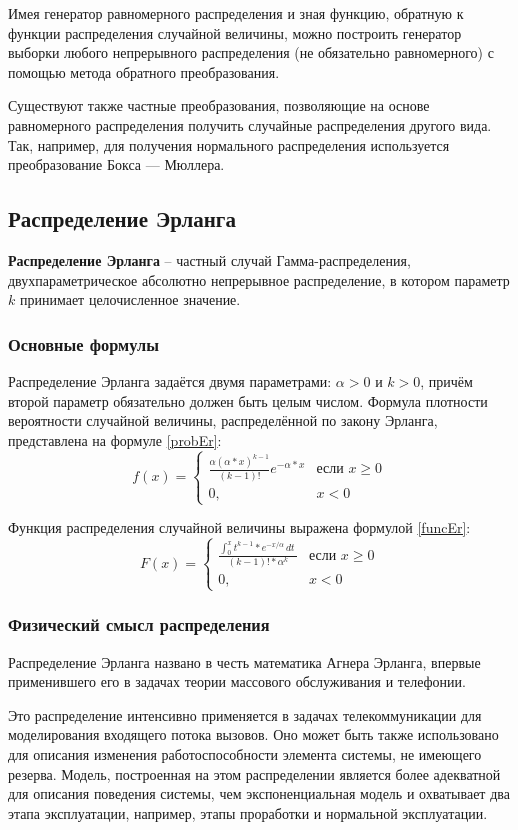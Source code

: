 Имея генератор равномерного распределения и зная функцию, обратную к функции распределения случайной величины, можно построить генератор выборки любого непрерывного распределения (не обязательно равномерного) с помощью метода обратного преобразования.

Существуют также частные преобразования, позволяющие на основе равномерного распределения получить случайные распределения другого вида. Так, например, для получения нормального распределения используется преобразование Бокса — Мюллера.

\subsection*{Распределение Эрланга}
\textbf{Распределение Эрланга} -- частный случай Гамма-распределения, двухпараметрическое абсолютно непрерывное распределение, в котором параметр $k$ принимает целочисленное значение.

\subsubsection*{Основные формулы}
Распределение Эрланга задаётся двумя параметрами: $\alpha > 0$ и $k > 0$, причём второй параметр обязательно должен быть целым числом. 
\newpage
Формула плотности вероятности случайной величины, распределённой по закону Эрланга, представлена на формуле \ref{probEr}:
\begin{equation}
	\label{probEr}
	f(x)= 
	\begin{cases}
		\frac{\alpha  (\alpha*x)^{k - 1}} {(k - 1)!}e^{-\alpha*x} & \text{если } x \geq 0 \\
		0,              & x < 0
	\end{cases}
\end{equation}

Функция распределения случайной величины выражена формулой \ref{funcEr}:
\begin{equation}
	\label{funcEr}
	F(x)= 
	\begin{cases}
		\frac{\int_{0}^{x} t^{k-1}*e^{-x/\alpha} \,dt \ } {(k - 1)!*\alpha^k} & \text{если } x \geq 0 \\
		0,              & x < 0
	\end{cases}
\end{equation}

\subsubsection*{Физический смысл распределения}
Распределение Эрланга названо в честь математика Агнера Эрланга, впервые применившего его в задачах теории массового обслуживания и телефонии. 

Это распределение интенсивно применяется в задачах телекоммуникации для моделирования входящего потока вызовов. Оно может быть также использовано для описания изменения работоспособности элемента системы, не имеющего резерва. Модель, построенная на этом распределении является более адекватной для описания поведения системы, чем экспоненциальная модель и охватывает два этапа эксплуатации, например, этапы проработки и нормальной эксплуатации. 